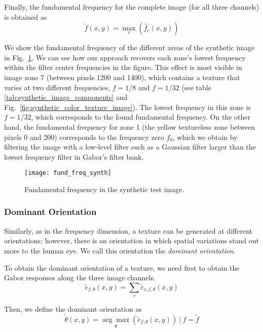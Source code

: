 Finally, the fundamental frequency for the complete image (for all three channels) is obtained as
\begin{equation}
	\widetilde{f}(x,y) =  \underset{c}{\max}\left(\widetilde{f_c}(x,y)\right)  \label{eq:fundamental_freq}
\end{equation}

We show the fundamental frequency of the different areas of the synthetic image in Fig.\ \ref{fig:fund_freq_synth}. We can see how our approach recovers each zone's lowest frequency within the filter center frequencies in the figure. This effect is most visible in image zone 7 (between pixels 1200 and 1400), which contains a texture that varies at two different frequencies, $f = 1/8$ and $f = 1/32$ (see table \ref{tab:synthetic_image_components} and Fig.\ \ref{fig:synthetic_color_texture_image}). The lowest frequency in this zone is $f = 1/32$, which corresponds to the found fundamental frequency. On the other hand, the fundamental frequency for zone 1 (the yellow textureless zone between pixels 0 and 200) corresponds to the frequency zero $f_0$, which we obtain by filtering the image with a low-level filter such as a Gaussian filter larger than the lowest frequency filter in Gabor's filter bank.

\begin{figure}[!ht]
	\texttt{[image: fund\_freq\_synth]}
    \caption{Fundamental frequency in the synthetic test image.}
    \label{fig:fund_freq_synth}
\end{figure}

\subsubsection{Dominant Orientation}
Similarly, as in the frequency dimension, a texture can be generated at different orientations; however, there is an orientation in which spatial variations stand out more to the human eye. We call this orientation the \textit{dominant orientation}.

To obtain the dominant orientation of a texture, we need first to obtain the Gabor responses along the three image channels.
\begin{equation}
	\widetilde{e}_{f, \theta}(x,y) = \underset{c}{\sum} \widetilde{e}_{c, f, \theta}(x,y)  \label{eq:gabor_energy_freq_orient}
\end{equation}

Then, we define the dominant orientation as 
\begin{equation}
	\widetilde{\theta}(x,y) =  \underset{\theta}{\arg\max}\left(\widetilde{e}_{f, \theta}(x,y)\right) ~|~ f = \widetilde{f} \label{eq:dominant_orient}
\end{equation}

